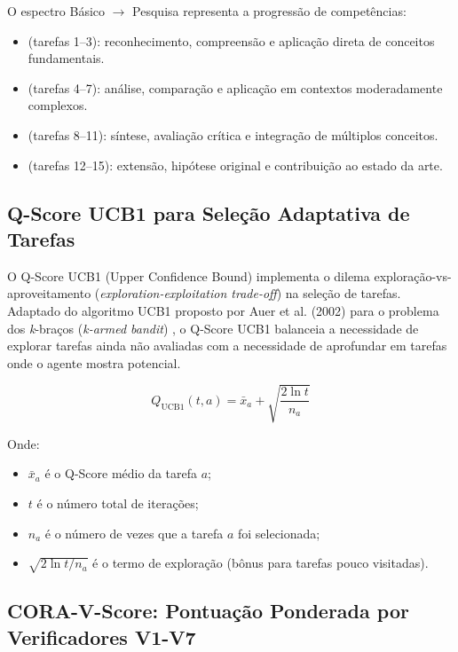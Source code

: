 O espectro Básico $\rightarrow$ Pesquisa representa a progressão
de competências:
\begin{itemize}
\item {} (tarefas 1--3): reconhecimento, compreensão
e aplicação direta de conceitos fundamentais.
\item {} (tarefas 4--7): análise, comparação e
aplicação em contextos moderadamente complexos.
\item {} (tarefas 8--11): síntese, avaliação crítica
e integração de múltiplos conceitos.
\item {} (tarefas 12--15): extensão, hipótese
original e contribuição ao estado da arte.
\end{itemize}

\subsection{Q-Score UCB1 para Seleção Adaptativa de Tarefas}

O Q-Score UCB1 (Upper Confidence Bound) implementa o dilema
exploração-vs-aproveitamento (\textit{exploration-exploitation
trade-off}) na seleção de tarefas. Adaptado do algoritmo UCB1
proposto por Auer et al. (2002) para o problema dos \textit{k}-braços
(\textit{k-armed bandit}) \cite{auer2002finite}, o Q-Score UCB1
balanceia a necessidade de explorar tarefas ainda não avaliadas com
a necessidade de aprofundar em tarefas onde o agente mostra potencial.

\begin{equation}
Q_{\text{UCB1}}(t,a) = \bar{x}_a + \sqrt{\frac{2 \ln t}{n_a}}
\label{eq:ucb1}
\end{equation}

Onde:
\begin{itemize}
\item $\bar{x}_a$ é o Q-Score médio da tarefa $a$;
\item $t$ é o número total de iterações;
\item $n_a$ é o número de vezes que a tarefa $a$ foi selecionada;
\item $\sqrt{2 \ln t / n_a}$ é o termo de exploração (bônus para
tarefas pouco visitadas).
\end{itemize}

\subsection{CORA-V-Score: Pontuação Ponderada por Verificadores V1-V7}

